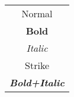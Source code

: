 \begin{tabular}{c|}
Normal\\
\textbf{Bold}\\
\emph{Italic}\\
Strike\\
\emph{\textbf{Bold+Italic}}
\end{tabular}